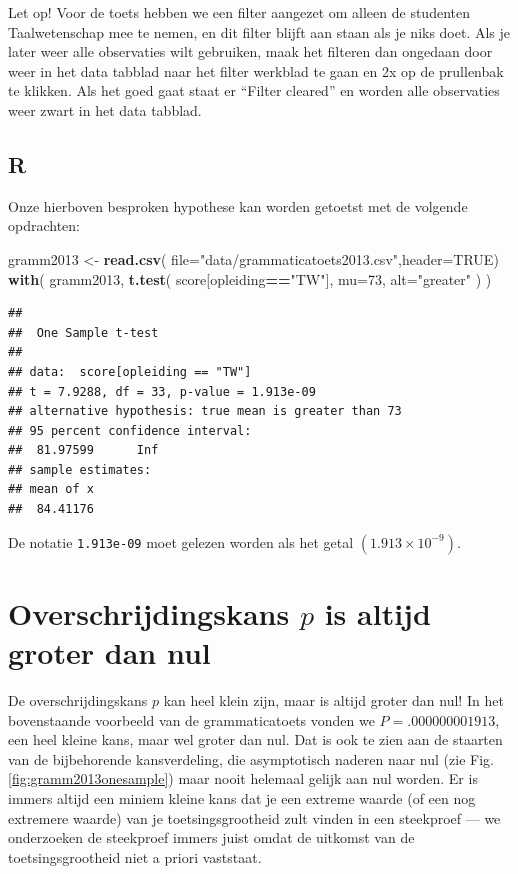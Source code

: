 \documentclass[
]{book}
\newenvironment{Shaded}{\begin{snugshade}}{\end{snugshade}}
\newcommand{\AttributeTok}[1]{\textcolor[rgb]{0.13,0.29,0.53}{#1}}
\newcommand{\ConstantTok}[1]{\textcolor[rgb]{0.56,0.35,0.01}{#1}}
\newcommand{\DecValTok}[1]{\textcolor[rgb]{0.00,0.00,0.81}{#1}}
\newcommand{\FunctionTok}[1]{\textcolor[rgb]{0.13,0.29,0.53}{\textbf{#1}}}
\newcommand{\NormalTok}[1]{#1}
\newcommand{\OtherTok}[1]{\textcolor[rgb]{0.56,0.35,0.01}{#1}}
\newcommand{\SpecialCharTok}[1]{\textcolor[rgb]{0.81,0.36,0.00}{\textbf{#1}}}
\newcommand{\StringTok}[1]{\textcolor[rgb]{0.31,0.60,0.02}{#1}}
\begin{document}
Let op! Voor de toets hebben we een filter aangezet om alleen de
studenten Taalwetenschap mee te nemen, en dit filter blijft aan staan
als je niks doet. Als je later weer alle observaties wilt gebruiken,
maak het filteren dan ongedaan door weer in het data tabblad naar het
filter werkblad te gaan en 2x op de prullenbak te klikken. Als het goed
gaat staat er ``Filter cleared'' en worden alle observaties weer zwart in
het data tabblad.

\subsection{R}\label{r-12}

Onze hierboven besproken hypothese kan worden getoetst met de volgende
opdrachten:

\begin{Shaded}
\begin{Highlighting}[]
\NormalTok{gramm2013 }\OtherTok{\textless{}{-}} \FunctionTok{read.csv}\NormalTok{( }\AttributeTok{file=}\StringTok{"data/grammaticatoets2013.csv"}\NormalTok{,}\AttributeTok{header=}\ConstantTok{TRUE}\NormalTok{)}
\FunctionTok{with}\NormalTok{( gramm2013,}
      \FunctionTok{t.test}\NormalTok{( score[opleiding}\SpecialCharTok{==}\StringTok{"TW"}\NormalTok{], }\AttributeTok{mu=}\DecValTok{73}\NormalTok{, }\AttributeTok{alt=}\StringTok{"greater"}\NormalTok{ ) )}
\end{Highlighting}
\end{Shaded}

\begin{verbatim}
## 
##  One Sample t-test
## 
## data:  score[opleiding == "TW"]
## t = 7.9288, df = 33, p-value = 1.913e-09
## alternative hypothesis: true mean is greater than 73
## 95 percent confidence interval:
##  81.97599      Inf
## sample estimates:
## mean of x 
##  84.41176
\end{verbatim}

De notatie \texttt{1.913e-09} moet gelezen worden als het getal
\((1.913 \times 10^{-9})\).

\section{\texorpdfstring{Overschrijdingskans \(p\) is altijd groter dan nul}{Overschrijdingskans p is altijd groter dan nul}}\label{sec:pgroterdannul}

De overschrijdingskans \(p\) kan heel klein zijn, maar is altijd groter
dan nul! In het bovenstaande voorbeeld van de grammaticatoets vonden we
\(P=.000000001913\), een heel kleine kans, maar wel groter dan nul. Dat is
ook te zien aan de staarten van de bijbehorende kansverdeling, die
asymptotisch naderen naar nul (zie Fig.\ref{fig:gramm2013onesample})
maar nooit helemaal gelijk aan nul worden. Er is immers altijd een
miniem kleine kans dat je een extreme waarde (of een nog extremere
waarde) van je toetsingsgrootheid zult vinden in een steekproef --- we
onderzoeken de steekproef immers juist omdat de uitkomst van de
toetsingsgrootheid niet a priori vaststaat.
\end{document}
